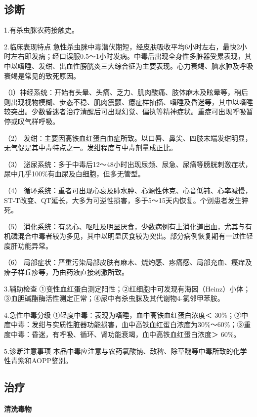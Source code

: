 \subsection{诊断}

1.有杀虫脒农药接触史。

2.临床表现特点
急性杀虫脒中毒潜伏期短，经皮肤吸收平均6小时左右，最快2小时左右即发病；经口误服0.5～1小时发病。中毒后出现全身性多脏器受累表现，其中以嗜睡、发绀、出血性膀胱炎三大综合征为主要表现。心力衰竭、脑水肿及呼吸衰竭是常见的致死原因。

（l）神经系统：开始有头晕、头痛、乏力、肌肉酸痛、肢体麻木及眩晕等，稍后则出现视物模糊、步态不稳、肌肉震颤、癔症样抽搐、嗜睡及昏迷等，其中以嗜睡较突出。少数昏迷者治疗清醒后可出现幻觉、偏执等精神症状。重症可出现呼吸暂停或叹气样呼吸。

（2）
发绀：主要因高铁血红蛋白血症所致。以口唇、鼻尖、四肢末端发绀明显，无气促是其中毒特点之一。发绀程度与中毒剂量成正比。

（3）
泌尿系统：多于中毒后12～48小时出现尿频、尿急、尿痛等膀胱刺激症状，尿中几乎100\%有血尿及白细胞，但多无管型。

（4）
循环系统：重者可出现心衰及肺水肿、心源性休克、心音低钝、心率减慢，ST-T改变、QT延长，大多为可逆性损害，多于5～15天内恢复。个别患者发生猝死。

（5）
消化系统：有恶心、呕吐及明显厌食，少数病例有上消化道出血，尤其与有机磷混合中毒者较为多见，其中以明显厌食较为突出。部分病例恢复期有一过性轻度肝功能异常。

（6）
局部症状：严重污染局部皮肤有麻木、烧灼感、疼痛感、局部充血、瘙痒及痱子样丘疹等，乃由药液直接刺激所致。

3.辅助检查
①变性血红蛋白测定阳性；②红细胞中可发现有海因（Heinz）小体；③血胆碱酯酶活性测定正常；④尿中有杀虫脒及其代谢物4-氯邻甲苯胺。

4.急性中毒分级 ①轻度中毒：表现为嗜睡，血中高铁血红蛋白浓度＜
30\%；②中度中毒：发绀与实质性脏器功能损害，血中高铁血红蛋白浓度为30\%～60\%；③重度中毒：昏迷，有呼吸、循环、肾功能衰竭，血中高铁血红蛋白浓度＞
60\%。

5.诊断注意事项
本品中毒应注意与农药氯酸钠、敌稗、除草醚等中毒所致的化学性青紫和AOPP鉴别。

\subsection{治疗}

\paragraph{清洗毒物}

